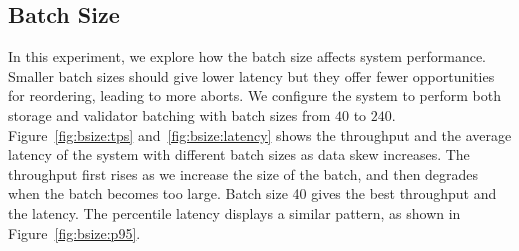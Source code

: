 \subsection{Batch Size}
In this experiment, we explore how the batch size affects system performance. 
Smaller batch sizes should give lower latency but they offer fewer opportunities for reordering, leading to more aborts. 
We configure the system to perform both storage and validator batching with batch sizes from $40$ to $240$.
Figure~\ref{fig:bsize:tps} and~\ref{fig:bsize:latency} shows the throughput and the average latency of the system with different batch sizes as data skew increases. The throughput first rises as we increase the size of the batch, and then degrades when the batch becomes too large. Batch size 40 gives the best throughput and the latency. The percentile latency displays a similar pattern, as shown in Figure~\ref{fig:bsize:p95}. 